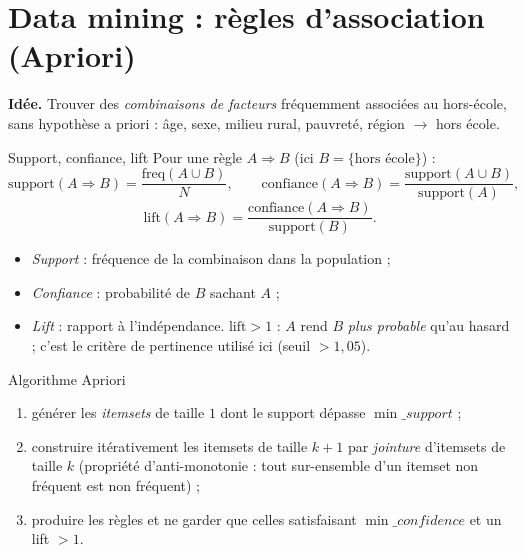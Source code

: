 \documentclass[11pt,a4paper]{article}
\begin{document}
\section{Data mining : règles d'association (Apriori)}
\label{sec:apriori}

\textbf{Idée.} Trouver des \emph{combinaisons de facteurs} fréquemment
associées au hors-école, sans hypothèse a priori : âge, sexe, milieu rural,
pauvreté, région $\to$ hors école.

\begin{meth}{Support, confiance, lift}
Pour une règle $A \Rightarrow B$ (ici $B=\{\text{hors école}\}$) :
\[
\text{support}(A\Rightarrow B) = \frac{\text{freq}(A\cup B)}{N},
\qquad
\text{confiance}(A\Rightarrow B) = \frac{\text{support}(A\cup B)}{\text{support}(A)},
\]
\[
\text{lift}(A\Rightarrow B) = \frac{\text{confiance}(A\Rightarrow B)}{\text{support}(B)}.
\]
\begin{itemize}[leftmargin=2em]
  \item \emph{Support} : fréquence de la combinaison dans la population ;
  \item \emph{Confiance} : probabilité de $B$ sachant $A$ ;
  \item \emph{Lift} : rapport à l'indépendance. $\text{lift}>1$ : $A$ rend
        $B$ \emph{plus probable} qu'au hasard ; c'est le critère de
        pertinence utilisé ici (seuil $>1{,}05$).
\end{itemize}
\end{meth}

\begin{meth}{Algorithme Apriori}
\begin{enumerate}[leftmargin=2em]
  \item générer les \emph{itemsets} de taille $1$ dont le support dépasse
        $\min\_support$ ;
  \item construire itérativement les itemsets de taille $k+1$ par
        \emph{jointure} d'itemsets de taille $k$ (propriété d'anti-monotonie :
        tout sur-ensemble d'un itemset non fréquent est non fréquent) ;
  \item produire les règles et ne garder que celles satisfaisant
        $\min\_confidence$ et un lift $>1$.
\end{enumerate}
\end{meth}
\end{document}
